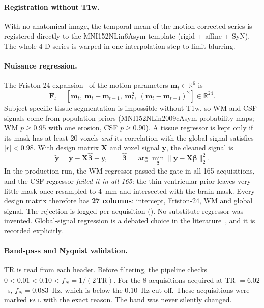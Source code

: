 \documentclass{ssnreview}
\begin{document}
\paragraph{Registration without T1w.} With no anatomical image, the temporal
mean of the motion-corrected series is registered directly to the
MNI152NLin6Asym template (rigid + affine + SyN). The whole 4-D series is warped
in one interpolation step to limit blurring.

\paragraph{Nuisance regression.} The Friston-24 expansion~\cite{friston1996} of
the motion parameters $\mathbf{m}_t\in\mathbb{R}^6$ is
\begin{equation}
  \mathbf{F}_t = \left[\mathbf{m}_t,\ \mathbf{m}_t-\mathbf{m}_{t-1},\
  \mathbf{m}_t^{2},\ (\mathbf{m}_t-\mathbf{m}_{t-1})^{2}\right] \in \mathbb{R}^{24}.
\end{equation}
Subject-specific tissue segmentation is impossible without T1w, so WM and
CSF signals come from population priors (MNI152NLin2009cAsym probability maps;
WM $p\ge0.95$ with one erosion, CSF $p\ge0.90$). A tissue regressor is kept
only if its mask has at least 20 voxels \emph{and} its correlation with the
global signal satisfies $|r|<0.98$. With design matrix $\mathbf{X}$ and voxel
signal $\mathbf{y}$, the cleaned signal is
\begin{equation}
  \tilde{\mathbf{y}} = \mathbf{y} - \mathbf{X}\hat{\boldsymbol\beta} + \bar{y},
  \qquad \hat{\boldsymbol\beta} = \arg\min_{\boldsymbol\beta}
  \lVert \mathbf{y}-\mathbf{X}\boldsymbol\beta \rVert_2^2 .
\end{equation}
In the production run, the WM regressor passed the gate in all 165
acquisitions, and the CSF regressor \emph{failed it in all 165}: the thin
ventricular prior leaves very little mask once resampled to 4~mm and
intersected with the brain mask. Every design matrix therefore has
\textbf{27 columns}: intercept, Friston-24, WM and global signal. The rejection
is logged per acquisition (\code{"CSF_status": "NOT PERFORMED"}). No substitute
regressor was invented. Global-signal regression is a debated choice in the
literature~\cite{murphy2017}, and it is recorded explicitly.

\paragraph{Band-pass and Nyquist validation.} TR is read from each header.
Before filtering, the pipeline checks
$0 < 0.01 < 0.10 < f_N = 1/(2\,\text{TR})$. For the 8 acquisitions acquired at
TR $=6.02$~s, $f_N = 0.083$~Hz, which is below the 0.10~Hz cut-off. These
acquisitions were marked \textsc{fail} with the exact reason. The band was
never silently changed.
\end{document}
